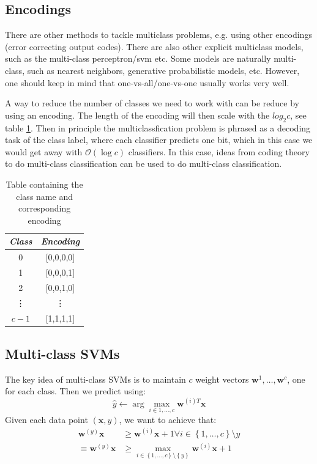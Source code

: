 \documentclass[a4paper,10pt,twoside]{article}
\begin{document}
\subsection{Encodings}

There are other methods to tackle multiclass problems, e.g. using other encodings (error correcting output codes). There are also other explicit multiclass models, such as the multi-class perceptron/svm etc. Some models are naturally multi-class, such as nearest neighbors, generative probabilistic models, etc. However, one should keep in mind that one-vs-all/one-vs-one usually works very well. 

A way to reduce the number of classes we need to work with can be reduce by using an encoding. The length of the encoding will then scale with the $log_{2}c$, see table \ref{binary-label-encoding}. Then in principle the multiclassfication problem is phrased as a decoding task of the class label, where each classifier predicts one bit, which in this case we would get away with $\mathcal{O}(\log c)$ classifiers. In this case, ideas from coding theory to do multi-class classification can be used to do multi-class classification.

\begin{table}
    \centering
    \begin{tabular}{cc}
        \toprule
        \textit{Class} & \textit{Encoding} \\
        \midrule
        0 & [0,0,0,0]\\
        1 & [0,0,0,1]\\
        2 & [0,0,1,0]\\
        \vdots & \vdots\\
        $c-1$ & [1,1,1,1]\\
        \bottomrule
    \end{tabular}
    \caption{Table containing the class name and corresponding encoding}
    \label{binary-label-encoding}
\end{table}

\subsection{Multi-class SVMs}

The key idea of multi-class SVMs is to maintain $c$ weight vectors $\mathbf{w}^{1},\ldots,\mathbf{w}^{c}$, one for each class. Then we predict using:
\begin{equation*}
    \hat{y} \leftarrow \arg\max_{i\in{1,\ldots,c}}\mathbf{w}^{(i)T}\mathbf{x}
\end{equation*}
Given each data point $(\mathbf{x},y)$, we want to achieve that:
\begin{align}\label{multiclasssvm}
    \mathbf{w}^{(y)}\mathbf{x}&\geq\mathbf{w}^{(i)}\mathbf{x}+1 \forall i\in\left\{1,\ldots, c\right\}\setminus{y}\\
    \equiv \mathbf{w}^{(y)}\mathbf{x}&\geq\max_{i\in\left\{1,\ldots,c\right\}\setminus\left\{y\right\}}\mathbf{w}^{(i)}\mathbf{x}+1
\end{align}
\end{document}
